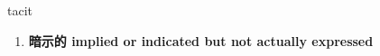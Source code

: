 
\begin{frame}
{\huge tacit}
\begin{center}
\begin{enumerate}\Large
  \item \textbf{暗示的 implied or indicated but not actually expressed}
\end{enumerate}
\end{center}
\end{frame}
